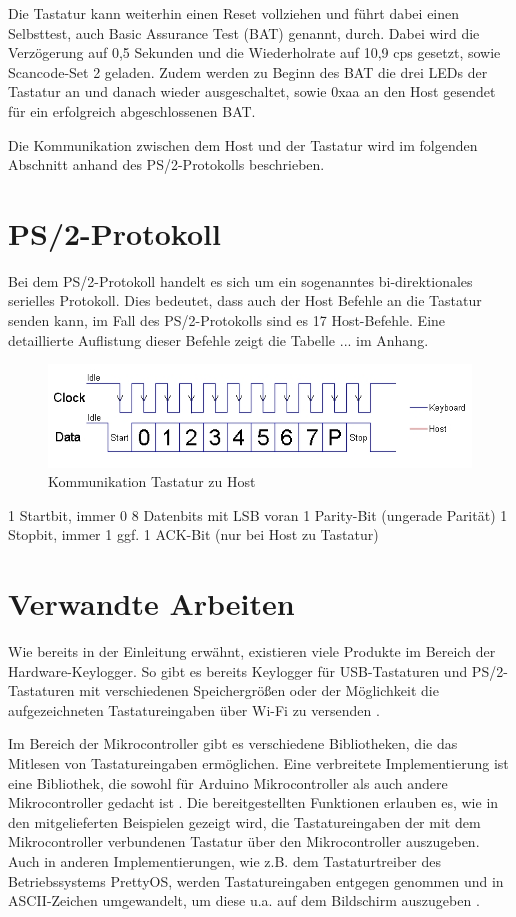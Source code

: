 Die Tastatur kann weiterhin einen Reset vollziehen und führt dabei einen Selbsttest, auch Basic Assurance Test (BAT) genannt, durch. Dabei wird die Verzögerung auf 0,5 Sekunden und die Wiederholrate auf 10,9 cps gesetzt, sowie Scancode-Set 2 geladen. Zudem werden zu Beginn des BAT die drei LEDs der Tastatur an und danach wieder ausgeschaltet, sowie 0xaa an den Host gesendet für ein erfolgreich abgeschlossenen BAT.

Die Kommunikation zwischen dem Host und der Tastatur wird im folgenden Abschnitt anhand des PS/2-Protokolls beschrieben.



\section{PS/2-Protokoll}
Bei dem PS/2-Protokoll handelt es sich um ein sogenanntes bi-direktionales serielles Protokoll. Dies bedeutet, dass auch der Host Befehle an die Tastatur senden kann, im Fall des PS/2-Protokolls sind es 17 Host-Befehle. Eine detaillierte Auflistung dieser Befehle zeigt die Tabelle ... im Anhang.
\begin{figure}
  \centering
  \includegraphics[width=1\textwidth]{images/device_to_host.jpg}
  \caption{Kommunikation Tastatur zu Host}
  \label{device_to_host}
\end{figure}
1 Startbit, immer 0
8 Datenbits mit LSB voran
1 Parity-Bit (ungerade Parität)
1 Stopbit, immer 1
ggf. 1 ACK-Bit (nur bei Host zu Tastatur)



\section{Verwandte Arbeiten}
Wie bereits in der Einleitung erwähnt, existieren viele Produkte im Bereich der Hardware-Keylogger. So gibt es bereits Keylogger für USB-Tastaturen und PS/2-Tastaturen mit verschiedenen Speichergrößen oder der Möglichkeit die aufgezeichneten Tastatureingaben über Wi-Fi zu versenden \cite{keelog}.

Im Bereich der Mikrocontroller gibt es verschiedene Bibliotheken, die das Mitlesen von Tastatureingaben ermöglichen. Eine verbreitete Implementierung ist eine Bibliothek, die sowohl für Arduino Mikrocontroller als auch andere Mikrocontroller gedacht ist \cite{ps2keyboard}. Die bereitgestellten Funktionen erlauben es, wie in den mitgelieferten Beispielen gezeigt wird, die Tastatureingaben der mit dem Mikrocontroller verbundenen Tastatur über den Mikrocontroller auszugeben. Auch in anderen Implementierungen, wie z.B. dem Tastaturtreiber des Betriebssystems PrettyOS, werden Tastatureingaben entgegen genommen und in ASCII-Zeichen umgewandelt, um diese u.a. auf dem Bildschirm auszugeben \cite{prettyos}.

